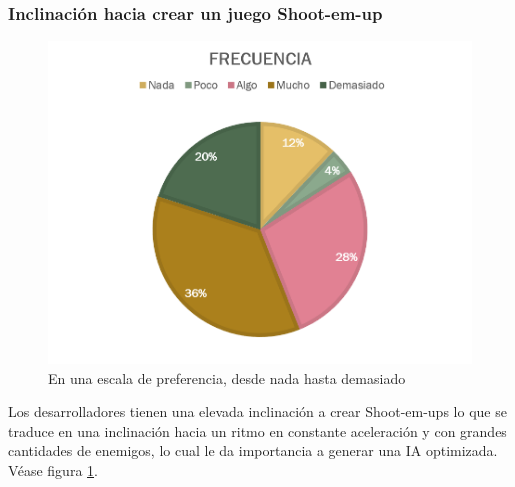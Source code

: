 \documentclass[]{article}
\begin{document}
\subsubsection{Inclinaci\'on hacia crear un juego Shoot-em-up}
\begin{figure}[H]
	
	\centering
	\includegraphics[width=1\textwidth]{Encuesta_tipo_shootemup}
	\caption{En una escala de preferencia, desde nada hasta demasiado} 
	\label{SHOOTEM}
	
\end{figure}
Los desarrolladores tienen una elevada inclinaci\'on a crear Shoot-em-ups lo que se traduce en una inclinaci\'on hacia un ritmo en constante aceleraci\'on y con grandes cantidades de enemigos, lo cual le da importancia a generar una IA optimizada. V\'ease figura \ref{SHOOTEM}.
\end{document}
